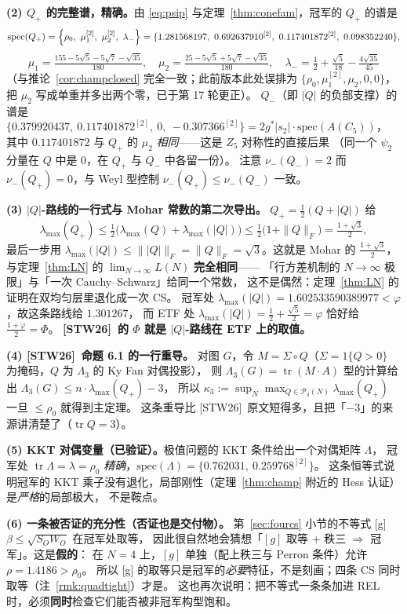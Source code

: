 \documentclass[UTF8,11pt]{ctexart}
\theoremstyle{definition}
\newcommand{\Lam}{\Lambda}
\newcommand{\tr}{\operatorname{tr}}
\newcommand{\STW}{\textup{[STW26]}}
\begin{document}
\textbf{(2) $Q_+$ 的完整谱，精确。}由 \eqref{eq:psip} 与定理~\ref{thm:conefam}，冠军的 $Q_+$ 的谱是
\[
\mathrm{spec}(Q_+)=\Bigl\{\rho_0,\ \mu_1^{[2]},\ \mu_2^{[2]},\ \lambda_-\Bigr\}
=\{1.281568197,\ 0.692637910^{[2]},\ 0.117401872^{[2]},\ 0.098352240\},
\]
\[
\mu_1=\tfrac{155-5\sqrt5-5\sqrt7-\sqrt{35}}{180},\quad
\mu_2=\tfrac{25-5\sqrt5+5\sqrt7-\sqrt{35}}{180},\quad
\lambda_-=\tfrac12+\tfrac{\sqrt5}{18}-\tfrac{4\sqrt{35}}{45}
\]
（与推论~\ref{cor:champclosed} 完全一致；此前版本此处误排为 $\{\rho_0,\mu_1^{[2]},\mu_2,0,0\}$，
把 $\mu_2$ 写成单重并多出两个零，已于第 17 轮更正）。
$Q_-$（即 $|Q|$ 的负部支撑）的谱是
$\{0.379920437,\ 0.117401872^{[2]},\ 0,\ -0.307366^{[2]}\}=2g^\ast|s_2|\cdot\mathrm{spec}(A(C_5))$，
其中 $0.117401872$ 与 $Q_+$ 的 $\mu_2$ \emph{相同}——这是 $Z_5$ 对称性的直接后果
（同一个 $\psi_2$ 分量在 $Q$ 中是 $0$，在 $Q_+$ 与 $Q_-$ 中各留一份）。
注意 $\nu_-(Q_-)=2$ 而 $\nu_-(Q_+)=0$，与 Weyl 型控制 $\nu_-(Q_+)\le\nu_-(Q_-)$ 一致。

\textbf{(3) $|Q|$-路线的一行式与 Mohar 常数的第二次导出。}
$Q_+=\frac12(Q+|Q|)$ 给
\[
\lambda_{\max}(Q_+)\le\tfrac12\bigl(\lambda_{\max}(Q)+\lambda_{\max}(|Q|)\bigr)\le\tfrac12\bigl(1+\|Q\|_F\bigr)=\tfrac{1+\sqrt3}2,
\]
最后一步用 $\lambda_{\max}(|Q|)\le\||Q|\|_F=\|Q\|_F=\sqrt3$。这就是 Mohar 的 $\frac{1+\sqrt3}2$，
与定理~\ref{thm:LN} 的 $\lim_{N\to\infty}L(N)$ \textbf{完全相同}——
「行方差机制的 $N\to\infty$ 极限」与「一次 Cauchy--Schwarz」给同一个常数，
这不是偶然：定理~\ref{thm:LN} 的证明在双均匀层里退化成一次 CS。
冠军处 $\lambda_{\max}(|Q|)=1.602533590389977<\varphi$，故这条路线给 $1.301267$，
而 ETF 处 $\lambda_{\max}(|Q|)=\frac12+\frac{\sqrt5}2=\varphi$ 恰好给 $\frac{1+\varphi}2=\Phi$。
\textbf{\STW\ 的 $\Phi$ 就是 $|Q|$-路线在 ETF 上的取值。}

\textbf{(4) \STW\ 命题 6.1 的一行重导。}
对图 $G$，令 $M=\Sigma\circ Q$（$\Sigma=1\{Q>0\}$ 为掩码，$Q$ 为 $\Lam_3$ 的 Ky Fan 对偶投影），
则 $\Lam_3(G)=\tr(M\cdot A)$ 型的计算给出 $\Lam_3(G)\le n\cdot\lambda_{\max}(Q_+)-3$，
所以 $\kappa_3:=\sup_N\max_{Q\in\mathcal P_3(N)}\lambda_{\max}(Q_+)$ 一旦 $\le\rho_0$ 就得到主定理。
这条重导比 \STW\ 原文短得多，且把「$-3$」的来源讲清楚了（$\tr Q=3$）。

\textbf{(5) KKT 对偶变量（已验证）。}极值问题的 KKT 条件给出一个对偶矩阵 $\Lambda$，
冠军处 $\tr\Lambda=\lambda=\rho_0$ \emph{精确}，$\mathrm{spec}(\Lambda)=\{0.762031,\ 0.259768^{[2]}\}$。
这条恒等式说明冠军的 KKT 乘子没有退化，局部刚性（定理~\ref{thm:champ} 附近的 Hess 认证）是\emph{严格}的局部极大，
不是鞍点。

\textbf{(6) 一条被否证的充分性（否证也是交付物）。}
第~\ref{sec:fourcs} 小节的不等式 [g] $\beta\le\sqrt{S_OW_O}$ 在冠军处取等，
因此很自然地会猜想「$[g]$ 取等 $+$ 秩三 $\Rightarrow$ 冠军」。这是\textbf{假的}：
在 $N=4$ 上，$[g]$ 单独（配上秩三与 Perron 条件）允许 $\rho=1.4186>\rho_0$。
所以 [g] 的取等只是冠军的\emph{必要}特征，不是刻画；四条 CS 同时取等（注~\ref{rmk:quadtight}）才是。
这也再次说明：把不等式一条条加进 REL 时，必须\textbf{同时}检查它们能否被非冠军构型饱和。
\end{document}
